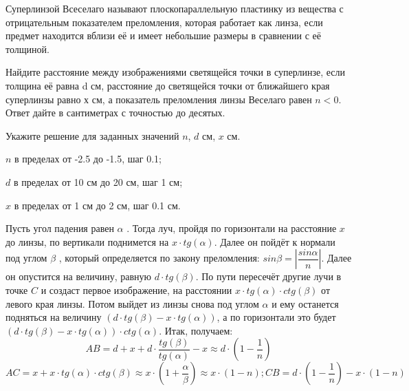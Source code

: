 Суперлинзой Всеселаго называют плоскопараллельную
пластинку из вещества с отрицательным показателем преломления, которая работает
как линза, если предмет находится вблизи её и имеет небольшие размеры в
сравнении с её толщиной.

Найдите расстояние между изображениями светящейся
точки в суперлинзе, если толщина её равна d см, расстояние до светящейся точки  от ближайшего края суперлинзы равно х см, а показатель преломления линзы Веселаго равен $n < 0$. Ответ дайте в сантиметрах с точностью до десятых.

Укажите решение для заданных значений $n$, $d$ см, $x$ см.

\paramSection

$n$ в пределах от -2.5 до -1.5, шаг 0.1;    

$d$ в пределах от 10 см до 20 см, шаг 1 см;  

$x$ в пределах от 1 см до 2 см, шаг 0.1 см.

\solutionSection

Пусть угол падения равен $\alpha$ . Тогда луч, пройдя по горизонтали на расстояние $x$ до линзы, 
по вертикали поднимется на $x \cdot tg(\alpha )$. Далее он пойдёт к нормали под углом  $\beta$ , который 
определяется по закону преломления: $sin\beta =\left|\dfrac{sin\alpha}{n}\right|$. Далее он опустится на 
величину, равную $d \cdot  tg( \beta )$. По пути пересечёт другие лучи в точке $C$ и создаст первое изображение,  
на расстоянии  $x \cdot tg(\alpha ) \cdot ctg( \beta )$  от левого края линзы. Потом выйдет из линзы снова под 
углом $\alpha$  и ему останется подняться на величину $(d \cdot  tg( \beta ) - x \cdot tg(\alpha ) )$, а по 
горизонтали это будет $(d \cdot  tg( \beta ) - x \cdot tg(\alpha )) \cdot ctg(\alpha )$. Итак, получаем:  
$$AB=d+x+d \cdot \dfrac{tg( \beta )}{tg(\alpha )}-x \approx d \cdot \left(1-\dfrac{1}{n}\right)$$
$AC=x+x \cdot tg(\alpha ) \cdot ctg( \beta ) \approx x \cdot \left(1+\dfrac{\alpha}{\beta} \right) \approx x 
\cdot (1-n);  CB=d \cdot \left(1-\dfrac{1}{n}\right)-x \cdot (1-n)$



